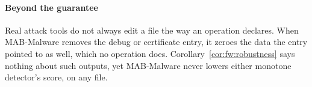 \paragraph{Beyond the guarantee}
Real attack tools do not always edit a file the way an operation declares. When MAB-Malware removes the debug or
certificate entry, it zeroes the data the entry pointed to as well, which no operation does.
Corollary~\ref{cor:fw:robustness} says nothing about such outputs, yet MAB-Malware never lowers either monotone
detector's score, on any file.
